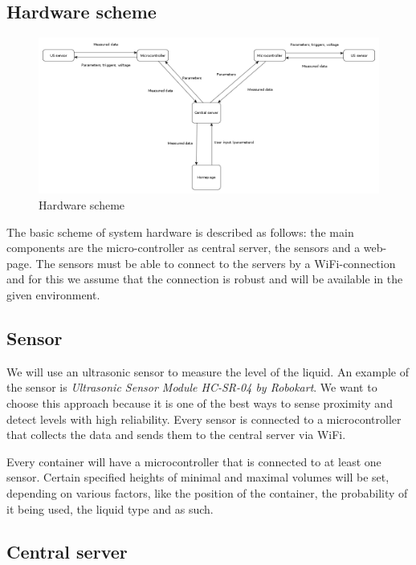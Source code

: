 \documentclass{article}
\begin{document}
\subsection{Hardware scheme}

\begin{figure}
\label{scheme}
\hspace{-3cm}\includegraphics[scale=0.5]{images/circuit.png}
\caption{Hardware scheme}
\end{figure}

The basic scheme of system hardware is described as follows: the main components
are the micro-controller as central server, the sensors and a web-page. The
sensors must be able to connect to the servers by a WiFi-connection and for this
we assume that the connection is robust and will be available in the given
environment. \par
\FloatBarrier
\subsection{Sensor}
We will use an ultrasonic sensor to measure the level of the liquid. An example of the sensor is \textit{Ultrasonic Sensor Module HC-SR-04 by Robokart}. 
We want to choose this approach because it is one of the best ways to sense proximity and detect levels with high reliability. Every sensor is connected to a microcontroller 
that collects the data and sends them to the central server via WiFi.  

Every container will have a microcontroller that is connected to at least one sensor. 
Certain specified heights of minimal and maximal volumes will be set, depending
on various factors, like the position of the container, the probability of it being used, 
the liquid type and as such.

\subsection{Central server}
\end{document}

